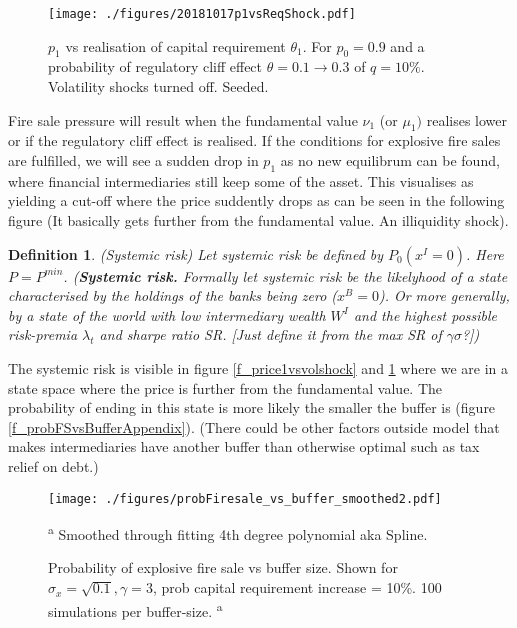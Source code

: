 \documentclass[11pt]{article}
\newtheorem{definition}{Definition}%
\begin{document}
\begin{appendices}
\begin{figure}[h]
\centering
\texttt{[image: ./figures/20181017p1vsReqShock.pdf]}
\caption{$p_1$ vs realisation of capital requirement $\theta_1$. For $p_0 = 0.9$ and a probability of regulatory cliff effect $\theta = 0.1  \rightarrow 0.3$ of $q = 10\% $. Volatility shocks turned off. Seeded.}
\label{f_price1vsRegShock}
\end{figure}

Fire sale pressure will result when the fundamental value $\nu_1$ (or $\mu_1)$ realises lower or if the regulatory cliff effect is realised. If the conditions for explosive fire sales are fulfilled, we will see a sudden drop in $p_1$ as no new equilibrum can be found, where financial intermediaries still keep some of the asset. This visualises as yielding a cut-off where the price suddently drops as can be seen in the following figure (It basically gets further from the fundamental value. An illiquidity shock).
\fi

\iffalse
\begin{definition} (Systemic risk)
Let systemic risk be defined by $P_0 (x^I=0)$. Here $P = P^{min}$.
(\textbf{Systemic risk.} Formally let systemic risk be the likelyhood of a state characterised by the holdings of the banks being zero ($x^B = 0$). Or more generally, by a state of the world with low intermediary wealth $W^I$ and the highest possible risk-premia $\lambda_t$ and sharpe ratio SR. [Just define it from the max SR of $\gamma\sigma$?])
\end{definition}

The systemic risk is visible in figure \ref{f_price1vsvolshock} and \ref{f_price1vsRegShock} where we are in a state space where the price is further from the fundamental value. The probability of ending in this state is more likely the smaller the buffer is (figure \ref{f_probFSvsBufferAppendix}). (There could be other factors outside model that makes intermediaries have another buffer than otherwise optimal such as tax relief on debt.)

\begin{figure}[h]
\centering
\texttt{[image: ./figures/probFiresale\_vs\_buffer\_smoothed2.pdf]}
\caption{Probability of explosive fire sale vs buffer size. Shown for $\sigma_x = \sqrt{0.1}, \gamma = 3$, prob capital requirement increase = 10\%. 100 simulations per buffer-size.\textsuperscript{\color{blue} a}}
{\small\textsuperscript{{\color{blue} a}} Smoothed through fitting 4th degree polynomial aka Spline.}
\label{f_probFSvsBuffer2}
\end{figure}



\end{appendices}
\end{document}
